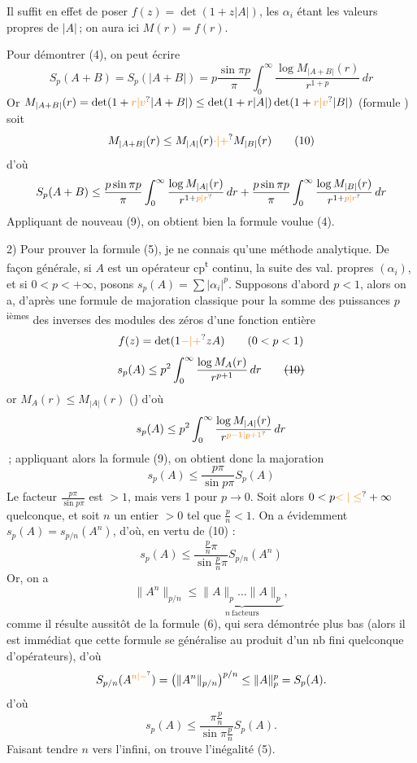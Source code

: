 Il suffit en effet de poser $f(z)=\det(1+z|A|)$,
les $\alpha_i$ étant les valeurs propres de $|A|$\,; on aura
ici $M(r)=f(r)$.

Pour démontrer (4), on  peut écrire
\[
S_p(A+B)=S_p(|A+B|)=p\frac{\sin\pi p}{\pi}\int_0^\infty
\frac{\log M_{|A+B|}(r)}{r^{1+p}}\,dr
\]
Or $M_{|A+B|}(r)=\det(1+\unsure{r|v}|A+B|)\leq\det(1+r|A|)\det(1+\unsure{r|v}|B|)$
(formule \unsure{\ldots})  soit
\[
M_{|A+B|}(r)\leq M_{|A|}(r)\unsure{\cdot|+}M_{|B|}(r)\tag*{(10)}
\]
d'où
\[
S_p(A+B)\leq\frac{p\sin\pi p}{\pi}\int_0^\infty\frac{\log M_{|A|}(r)}{r^{1+\unsure{p|r}}}\,dr
+\frac{p\sin\pi p}{\pi}\int_0^\infty\frac{\log M_{|B|}(r)}{r^{1+\unsure{p|r}}}\,dr
\]
Appliquant de nouveau (9), on obtient bien la
formule voulue (4).


2) Pour prouver la formule (5), je ne connais
qu'une méthode analytique. De façon générale,
 si $A$ est un opérateur cp\textsuperscript{t} continu,  la
suite des val. propres $(\alpha_i)$,  et si
$0<p<+\infty$, posons $s_p(A)=\sum|\alpha_i|^p$.
Supposons d'abord $p<1$, alors on a, d'après
une formule de majoration classique pour la
somme des puissances $p$\textsuperscript{ièmes} des inverses des
modules des zéros d'une fonction entière
\[
f(z)=\det(1\unsure{-|+}zA)\qquad(0<p<1)
\]
\[
s_p(A)\leq p^2\int_0^\infty\frac{\log M_A(r)}{r^{p+1}}\,dr\tag*{\deleted{(10)}}
\]
or $M_A(r)\leq M_{|A|}(r)$ (\unsure{\ldots\ --}) d'où
\[
s_p(A)\leq p^2\int_0^\infty\frac{\log M_{|A|}(r)}{r^{\unsure{p-1|p+1}}}\,dr
\]
\,; appliquant alors la formule
(9), on obtient donc la majoration
\[
s_p(A)\leq\frac{p\pi}{\sin p\pi}S_p(A)\tag*{(10)}
\]
Le facteur $\frac{p\pi}{\sin p\pi}$ est $>1$, mais  vers 1
pour $p\to0$. Soit alors $0<p\unsure{<|\leq}+\infty$ quelconque,
et soit $n$ un entier $>0$ tel que $\frac{p}{n}<1$.
On a évidemment $s_p(A)=s_{p/n}(A^n)$, d'où, en
vertu de (10) :
\[
s_p(A)\leq\frac{\frac{p}{n}\pi}{\sin\frac{p}{n}\pi}S_{p/n}(A^n)
\]
Or, on a 
\[
\|A^n\|_{p/n}\leq\underbrace{\|A\|_p\ldots\|A\|_p}_{n\ \text{facteurs}},
\]
comme il résulte aussitôt de la formule (6), qui sera
démontrée plus bas (alors il est immédiat
que cette formule se généralise au produit d'un
nb fini quelconque d'opérateurs), d'où
\[
S_{p/n}(A^{\unsure{n|{-}}})=\left(\|A^n\|_{p/n}\right)^{p/n}
\leq\|A\|_p^p=S_p(A).
\]
d'où
\[
s_p(A)\leq\frac{\pi\frac{p}{n}}{\sin\pi\frac{p}{n}}S_p(A).
\]
Faisant tendre $n$ vers l'infini, on trouve l'inégalité (5).

